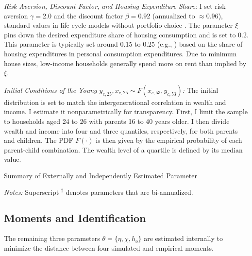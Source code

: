 \documentclass[12pt]{article}
\begin{document}

\textit{Risk Aversion, Discount Factor, and Housing Expenditure Share:} I set risk aversion $\gamma=2.0$ and the discount factor $\beta=0.92$ (annualized to $\approx0.96$), standard values in life-cycle models without portfolio choice \citep[see e.g.,][]{Kaplan2020,Boar2018}. The parameter $\xi$ pins down the desired expenditure share of housing consumption and is set to 0.2. This parameter is typically set around 0.15 to 0.25 (e.g., \citealp{Kaplan2020,Chatterjee2015,Paz-Pardo2019,davis2011household}) based on the share of housing expenditures in personal consumption expenditures. Due to minimum house sizes, low-income households generally spend more on rent than implied by $\xi$.


\textit{Initial Conditions of the Young $y_{c,25},x_{c,25}\sim F(x_{c,53},y_{c,53})$:} 
The initial distribution is set to match the intergenerational correlation in wealth and income. I estimate it nonparametrically for transparency. First, I limit the sample to households aged 24 to 26 with parents 16 to 40 years older. I then divide wealth and income into four and three quantiles, respectively, for both parents and children. The PDF $F(\cdot)$ is then given by the empirical probability of each parent-child combination. The wealth level of a quartile is defined by its median value.

 
\begin{table}
	\center
	\begin{threeparttable}
		\caption{Summary of Externally and Independently Estimated Parameter}\label{tab:calpar}
		\small
		
		\footnotesize
		\textit{Notes:} Superscript $^\dagger$ denotes parameters that are bi-annualized.
	\end{threeparttable}
\end{table}


\subsection{Moments and Identification}
The remaining three parameters $\theta=\{\eta,\chi,h_o\}$ are estimated internally to minimize the distance between four simulated and empirical moments. 
\end{document}
